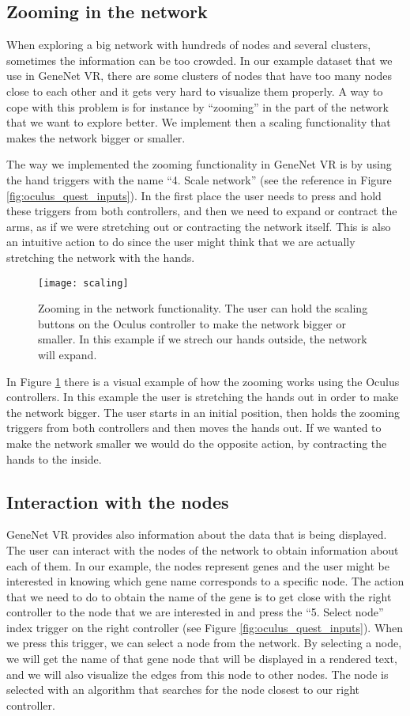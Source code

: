 \subsection{Zooming in the network}
When exploring a big network with hundreds of nodes and several clusters, sometimes the information can be too crowded. In our example dataset that we use in GeneNet VR, there are some clusters of nodes that have too many nodes close to each other and it gets very hard to visualize them properly. A way to cope with this problem is for instance by “zooming” in the part of the network that we want to explore better. We implement then a scaling functionality that makes the network bigger or smaller.

The way we implemented the zooming functionality in GeneNet VR is by using the hand triggers with the name “4. Scale network” (see the reference in Figure \ref{fig:oculus_quest_inputs}). In the first place the user needs to press and hold these triggers from both controllers, and then we need to expand or contract the arms, as if we were stretching out or contracting the network itself. This is also an intuitive action to do since the user might think that we are actually stretching the network with the hands.

\begin{figure}[h!]
    \centering%
    \texttt{[image: scaling]}
    \caption{Zooming in the network functionality. The user can hold the scaling buttons on the Oculus controller to make the network bigger or smaller. In this example if we strech our hands outside, the network will expand.}
    \label{fig:scaling}
\end{figure}%


In Figure \ref{fig:scaling} there is a visual example of how the zooming works using the Oculus controllers. In this example the user is stretching the hands out in order to make the network bigger. The user starts in an initial position, then holds the zooming triggers from both controllers and then moves the hands out. If we wanted to make the network smaller we would do the opposite action, by contracting the hands to the inside.

\subsection{Interaction with the nodes}
GeneNet VR provides also information about the data that is being displayed. The user can interact with the nodes of the network to obtain information about each of them. In our example, the nodes represent genes and the user might be interested in knowing which gene name corresponds to a specific node. The action that we need to do to obtain the name of the gene is to get close with the right controller to the node that we are interested in and press the “5. Select node” index trigger on the right controller (see Figure \ref{fig:oculus_quest_inputs}). When we press this trigger, we can select a node from the network. By selecting a node, we will get the name of that gene node that will be displayed in a rendered text, and we will also visualize the edges from this node to other nodes. The node is selected with an algorithm that searches for the node closest to our right controller.

